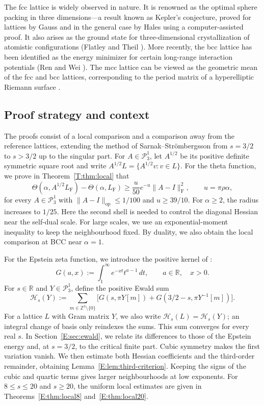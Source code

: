 \documentclass[reqno,english]{amsart}
\theoremstyle{definition}
\newtheorem{open problem}[theorem]{Open Problem}
\theoremstyle{remark}
\theoremstyle{plain}
\newcommand{\R}{{\mathbb R}}
\numberwithin{equation}{section}
\newcommand{\Z}{\mathbb Z}
\newcommand{\FCC}{L_{\mathrm F}}
\newcommand{\HH}{\mathcal H}
\newcommand{\PP}{\mathcal P_3^1}
\newcommand{\op}{\mathrm{op}}
\newcommand{\frob}{\mathrm F}
\newcommand{\Th}{\Theta}
\begin{document}
The fcc lattice is widely observed in nature. It is renowned as the optimal sphere packing in three dimensions---a result known as Kepler's conjecture, proved for lattices by Gauss \cite{Gauss1840} and in the general case by Hales \cite{Hales} using a computer-assisted proof.
It also arises as the ground state for three-dimensional crystallization of atomistic configurations (Flatley and Theil \cite{Theil2015}).
More recently, the bcc lattice has been identified as the energy minimizer for certain long-range interaction potentials (Ren and Wei \cite{Ren2023}).
The mcc lattice can be viewed as the geometric mean of the fcc and bcc lattices, corresponding to the period matrix of a hyperelliptic Riemann surface \cite{Conwaybook}.



\subsection{Proof strategy and context}\label{sec:proof-strategy}
The proofs consist of a local comparison and a comparison away from the
reference lattices, extending the method of Sarnak--Str\"{o}mbergsson \cite{SS}
from $s=3/2$ to $s>3/2$ up to the singular part. For $A\in\PP$, let $A^{1/2}$ be its positive definite
symmetric square root and write $A^{1/2}L=\{A^{1/2}v:v\in L\}$.
For the theta function, we prove in Theorem~\ref{T:thm:local} that
\[
 \Th(\alpha,A^{1/2}\FCC)-\Th(\alpha,\FCC)
 \ge\frac{u}{50}e^{-u}\|A-I\|_{\frob}^2,
 \qquad u=\pi\rho\alpha,
\]
for every $A\in\PP$ with $\|A-I\|_{\op}\le1/100$ and $u\ge39/10$.
For $\alpha\ge2$, the radius increases to $1/25$.
Here the second shell is needed to control the diagonal Hessian near the
self-dual scale. For large scales, we use an exponential-moment inequality
to keep the neighbourhood fixed. By duality, we also obtain the local
comparison at BCC near $\alpha=1$.

For the Epstein zeta function, we introduce the positive kernel
of \cite[(24)]{SS}:
\begin{equation}
\label{E:eq:G}
 G(a,x):=\int_1^\infty e^{-xt}t^{a-1}\,dt,
 \qquad a\in\R,\quad x>0.
\end{equation}
For $s\in\R$ and $Y\in\PP$, define the positive Ewald sum
\[
 \HH_s(Y):=\sum_{m\in\Z^3\setminus\{0\}}
 \bigl[G(s,\pi Y[m])+G(3/2-s,\pi Y^{-1}[m])\bigr].
\]
For a lattice $L$ with Gram matrix $Y$, we also write
$\HH_s(L)=\HH_s(Y)$; an integral change of basis only reindexes the sums.
This sum converges for every real $s$. In Section~\ref{E:sec:ewald}, we
relate its differences to those of the Epstein energy and, at $s=3/2$,
to the critical finite part. Cubic symmetry makes the first variation
vanish. We then estimate both Hessian coefficients and the third-order
remainder, obtaining Lemma~\ref{E:lem:third-criterion}. Keeping the signs
of the cubic and quartic terms gives larger neighbourhoods at low
exponents. For $8\le s\le20$ and $s\ge20$, the uniform local estimates
are given in Theorems~\ref{E:thm:local8} and~\ref{E:thm:local20}.
\end{document}

